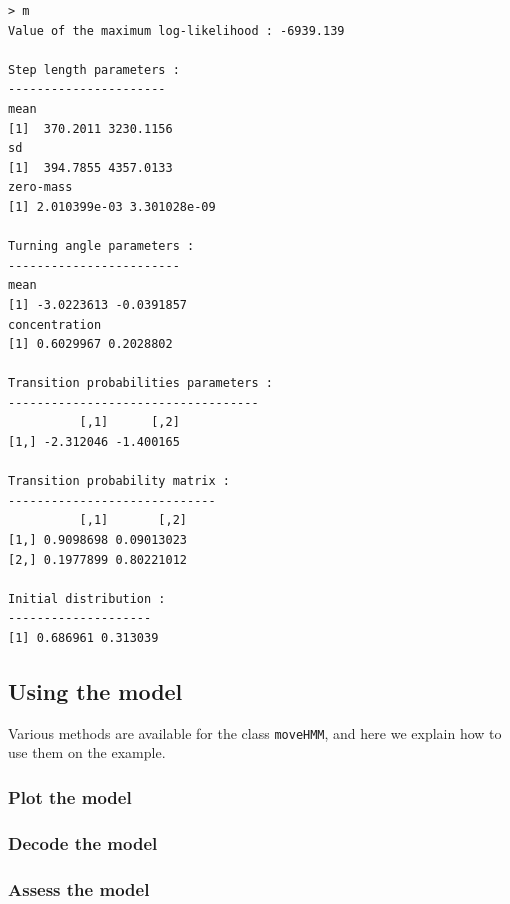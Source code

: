 \documentclass[]{article}
\begin{document}
\begin{lstlisting}
> m
Value of the maximum log-likelihood : -6939.139 

Step length parameters :
----------------------
mean 
[1]  370.2011 3230.1156
sd 
[1]  394.7855 4357.0133
zero-mass 
[1] 2.010399e-03 3.301028e-09

Turning angle parameters :
------------------------
mean 
[1] -3.0223613 -0.0391857
concentration 
[1] 0.6029967 0.2028802

Transition probabilities parameters :
-----------------------------------
          [,1]      [,2]
[1,] -2.312046 -1.400165

Transition probability matrix :
-----------------------------
          [,1]       [,2]
[1,] 0.9098698 0.09013023
[2,] 0.1977899 0.80221012

Initial distribution :
--------------------
[1] 0.686961 0.313039
\end{lstlisting}

\subsection{Using the model}
Various methods are available for the class \texttt{moveHMM}, and here we explain how to use them on the example.

\subsubsection{Plot the model}



\subsubsection{Decode the model}

\subsubsection{Assess the model}
\end{document}
